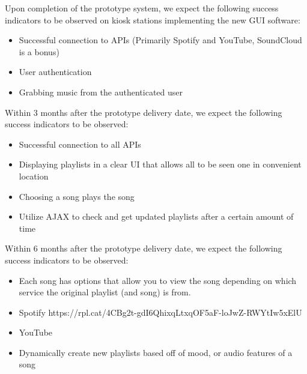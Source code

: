 Upon completion of the prototype system, we expect the following success indicators to be observed on kiosk stations implementing the new GUI software:
\begin{itemize}
  \item Successful connection to APIs (Primarily Spotify and YouTube, SoundCloud is a bonus)
  \item User authentication
  \item Grabbing music from the authenticated user
\end{itemize}

Within 3 months after the prototype delivery date, we expect the following success indicators to be observed:
\begin{itemize}
  \item Successful connection to all APIs
  \item Displaying playlists in a clear UI that allows all to be seen one in convenient location
  \item Choosing a song plays the song
  \item Utilize AJAX to check and get updated playlists after a certain amount of time
\end{itemize}

Within 6 months after the prototype delivery date, we expect the following success indicators to be observed:
\begin{itemize}
  \item Each song has options that allow you to view the song depending on which service the original playlist (and song) is from.
    \item Spotify https://rpl.cat/4CBg2t-gdI6QhixqLtxqOF5aF-loJwZ-RWYtIw5xElU
    \item YouTube 
  \item Dynamically create new playlists based off of mood, or audio features of a song
\end{itemize}

